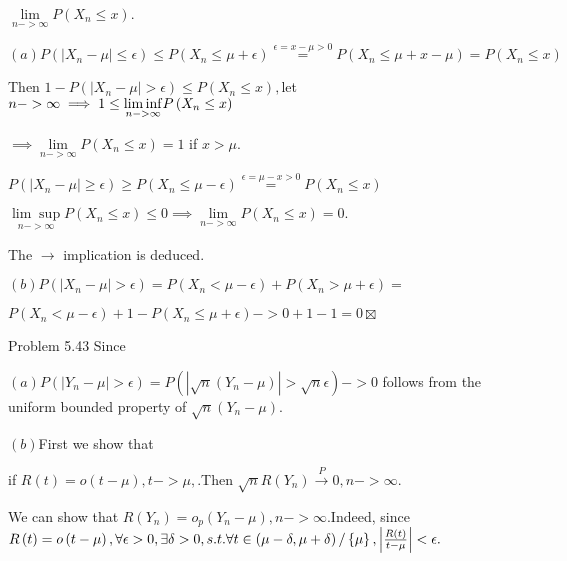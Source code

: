 \documentclass{article}
\begin{document}
$\underset{n->\infty }{\lim }P\left( X_{n}\leq x\right) .$

$\left( a\right) P\left( \left\vert X_{n}-\mu \right\vert \leq \epsilon
\right) \leq P\left( X_{n}\leq \mu +\epsilon \right) \overset{\epsilon
=x-\mu >0}{=}P\left( X_{n}\leq \mu +x-\mu \right) =P\left( X_{n}\leq
x\right) $

Then $1-P\left( \left\vert X_{n}-\mu \right\vert >\epsilon \right) \leq
P\left( X_{n}\leq x\right) ,$let $n->\infty \implies 1\leq \underset{%
n->\infty }{\lim \inf }P\left( X_{n}\leq x\right) $

$\implies \underset{n->\infty }{\lim }P\left( X_{n}\leq x\right) =1$ if $%
x>\mu .$

$P\left( \left\vert X_{n}-\mu \right\vert \geq \epsilon \right) \geq P\left(
X_{n}\leq \mu -\epsilon \right) \overset{\epsilon =\mu -x>0}{=}P\left(
X_{n}\leq x\right) $

\bigskip $\underset{n->\infty }{\lim \sup }P\left( X_{n}\leq x\right) \leq
0\implies \underset{n->\infty }{\lim }P\left( X_{n}\leq x\right) =0.$

The $\rightarrow $ implication is deduced.

$\left( b\right) P\left( \left\vert X_{n}-\mu \right\vert >\epsilon \right)
=P\left( X_{n}<\mu -\epsilon \right) +P\left( X_{n}>\mu +\epsilon \right) =$

$P\left( X_{n}<\mu -\epsilon \right) +1-P\left( X_{n}\leq \mu +\epsilon
\right) ->0+1-1=0\boxtimes $

\bigskip 

Problem 5.43 Since %


$\left( a\right) P\left( \left\vert Y_{n}-\mu \right\vert >\epsilon \right)
=P\left( \left\vert \sqrt{n}\left( Y_{n}-\mu \right) \right\vert >\sqrt{n}%
\epsilon \right) ->0$ follows from the  uniform bounded property of $\sqrt{n}%
\left( Y_{n}-\mu \right) .$

$\left( b\right) $First we show that

if $R\left( t\right) =o\left( t-\mu \right) ,t->\mu ,.$Then $\sqrt{n}R\left(
Y_{n}\right) \overset{P}{\rightarrow }0,n->\infty .$

We can show that $R\left( Y_{n}\right) =o_{p}\left( Y_{n}-\mu \right)
,n->\infty .$Indeed, since $R\left( t\right) =o\left( t-\mu \right) ,\forall
\epsilon >0,\exists \delta >0,s.t.\forall t\in \left( \mu -\delta ,\mu
+\delta \right) /\left\{ \mu \right\} ,\left\vert \frac{R\left( t\right) }{%
t-\mu }\right\vert <\epsilon .$
\end{document}
